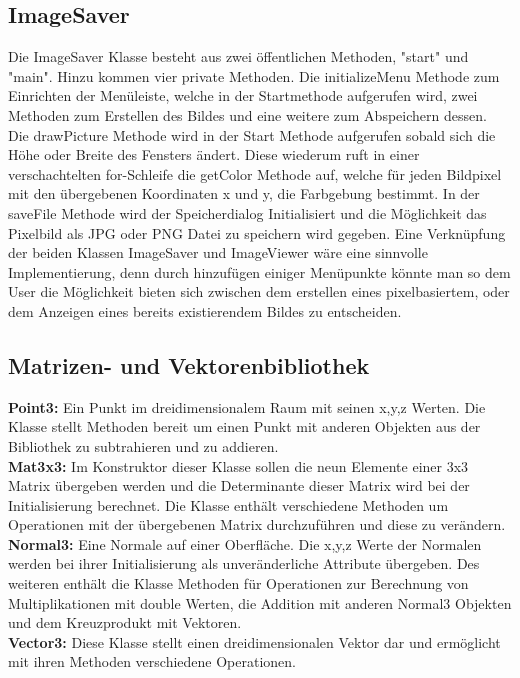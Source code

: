 \documentclass[14pt]{extarticle}
\begin{document}
\subsection{ImageSaver}
Die ImageSaver Klasse besteht aus zwei öffentlichen Methoden, "start" und "main". 
Hinzu kommen vier private Methoden. Die initializeMenu Methode zum Einrichten der Menüleiste, welche in der Startmethode aufgerufen wird, zwei Methoden zum Erstellen des Bildes und eine weitere zum Abspeichern dessen. 
\newline
Die drawPicture Methode wird in der Start Methode aufgerufen sobald sich die Höhe oder Breite des Fensters ändert. Diese wiederum ruft in einer verschachtelten for-Schleife die getColor Methode auf, welche für jeden Bildpixel mit den übergebenen Koordinaten x und y, die Farbgebung bestimmt. 
\newline
In der saveFile Methode wird der Speicherdialog Initialisiert und die Möglichkeit das Pixelbild als JPG oder PNG Datei zu speichern wird gegeben. 
\newline
Eine Verknüpfung der beiden Klassen ImageSaver und ImageViewer wäre eine sinnvolle Implementierung, denn durch hinzufügen einiger Menüpunkte könnte man so dem User die Möglichkeit bieten sich zwischen dem erstellen eines pixelbasiertem, oder dem Anzeigen eines bereits existierendem Bildes zu entscheiden. 

\subsection{Matrizen- und Vektorenbibliothek}
\textbf{Point3:} Ein Punkt im dreidimensionalem Raum mit seinen x,y,z Werten. Die Klasse stellt Methoden bereit um einen Punkt mit anderen Objekten aus der Bibliothek zu subtrahieren und zu addieren.
\\\textbf{Mat3x3:} Im Konstruktor dieser Klasse sollen die neun Elemente einer 3x3 Matrix übergeben werden und die Determinante dieser Matrix wird bei der Initialisierung berechnet. Die Klasse enthält verschiedene Methoden um Operationen mit der übergebenen Matrix durchzuführen und diese zu verändern. 
\\\textbf{Normal3:} Eine Normale auf einer Oberfläche. Die x,y,z Werte der Normalen werden bei ihrer Initialisierung als unveränderliche Attribute übergeben. Des weiteren enthält die Klasse Methoden für Operationen zur Berechnung von Multiplikationen mit double Werten, die Addition mit anderen Normal3 Objekten und dem Kreuzprodukt mit Vektoren.
\\\textbf{Vector3:} Diese Klasse stellt einen dreidimensionalen Vektor dar und ermöglicht mit ihren Methoden verschiedene Operationen.
\end{document}
